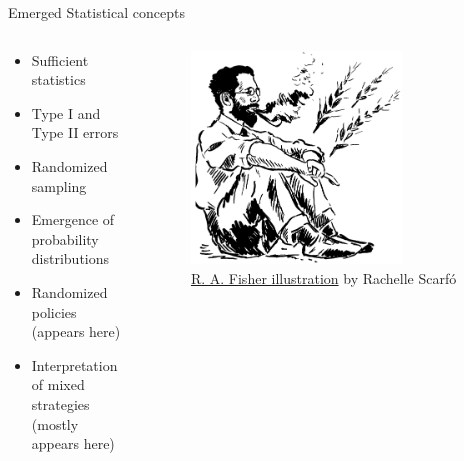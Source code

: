 \documentclass{beamer}
\theoremstyle{definition}
\begin{document}
\begin{frame}{Emerged Statistical concepts}


\begin{columns}

\begin{column}{0.5\textwidth}
            
\begin{itemize}
    \item Sufficient statistics
    \item Type I and Type II errors
    \item Randomized sampling
    \item Emergence of probability distributions
    \item Randomized policies (appears here)
    \item Interpretation of mixed strategies (mostly appears here)
\end{itemize}
        \end{column}

\begin{column}{0.5\textwidth}
    \begin{figure}
    \centering
        \includegraphics[width=0.75\textwidth]{img/RAFisher.png}
        \caption{\small \centering \href{https://statisticsblog.com/2012/01/15/r-a-fisher-illustration/}{R. A. Fisher illustration} by Rachelle Scarfó}
    \end{figure}
\end{column}
        

\end{columns}


\end{frame}
\end{document}
